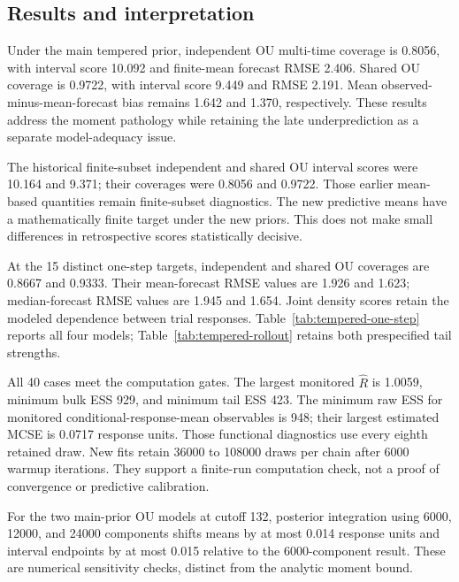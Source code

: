 
\subsection{Results and interpretation}

    Under the main tempered prior, independent OU multi-time coverage is
    0.8056, with interval score 10.092
    and finite-mean forecast RMSE 2.406.
    Shared OU coverage is 0.9722, with interval score
    9.449 and RMSE 2.191.
    Mean observed-minus-mean-forecast bias remains
    1.642 and 1.370, respectively.
    These results address the moment pathology while retaining the late
    underprediction as a separate model-adequacy issue.

    The historical finite-subset independent and shared OU interval scores
    were 10.164 and
    9.371; their coverages were
    0.8056 and
    0.9722. Those earlier mean-based quantities
    remain finite-subset diagnostics. The new predictive means have a
    mathematically finite target under the new priors. This does not make
    small differences in retrospective scores statistically decisive.

    At the 15 distinct one-step targets, independent and shared OU coverages
    are 0.8667 and
    0.9333. Their mean-forecast RMSE values are
    1.926 and
    1.623; median-forecast RMSE values are
    1.945 and
    1.654.
    Joint density scores retain the modeled dependence between trial
    responses. Table~\ref{tab:tempered-one-step} reports all four models;
    Table~\ref{tab:tempered-rollout} retains both prespecified tail strengths.

    All 40 cases meet the computation gates. The largest monitored
    $\widehat R$ is 1.0059, minimum bulk ESS
    929, and minimum tail ESS
    423. The minimum raw ESS for monitored
    conditional-response-mean observables is
    948; their largest estimated MCSE
    is 0.0717 response units. Those
    functional diagnostics use every eighth retained draw. New fits retain
    36000 to 108000
    draws per chain after 6000 warmup iterations. They support a finite-run
    computation check, not a proof of convergence or predictive calibration.

    For the two main-prior OU models at cutoff 132, posterior integration
    using 6000, 12000, and 24000 components shifts means by at most
    0.014 response units and interval
    endpoints by at most 0.015
    relative to the 6000-component result. These are numerical sensitivity
    checks, distinct from the analytic moment bound.

